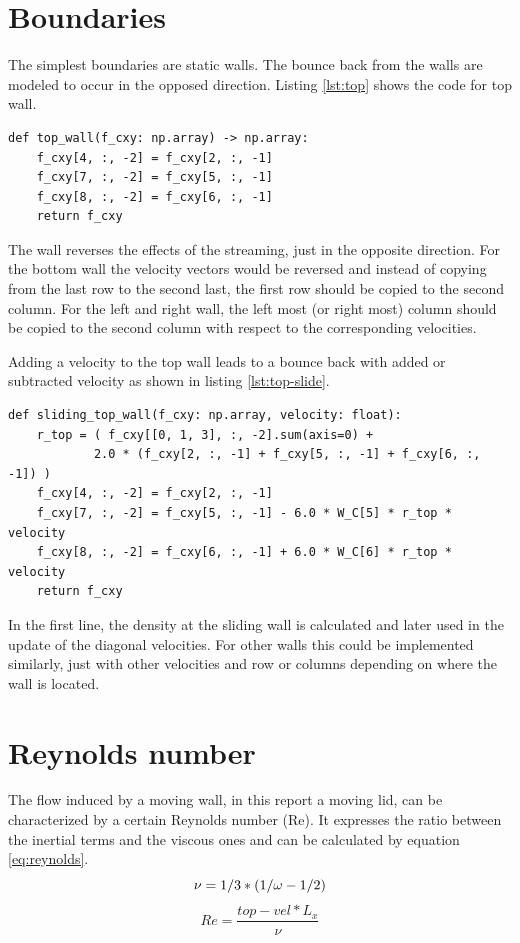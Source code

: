 \documentclass[a4paper,12pt, oneside]{book}
\begin{document}
\section{Boundaries}
The simplest boundaries are static walls. 
The bounce back from the walls are modeled to occur in the opposed direction. 
Listing \ref{lst:top} shows the code for top wall.
\begin{center}
  \begin{lstlisting}[caption=Bounce back at the top wall.,label=lst:top, basicstyle=\small]
def top_wall(f_cxy: np.array) -> np.array:
    f_cxy[4, :, -2] = f_cxy[2, :, -1]
    f_cxy[7, :, -2] = f_cxy[5, :, -1]
    f_cxy[8, :, -2] = f_cxy[6, :, -1]
    return f_cxy
  \end{lstlisting}
\end{center}
The wall reverses the effects of the streaming, just in the opposite direction.
For the bottom wall the velocity vectors would be reversed and instead of copying from the last row to the second last, the first row should be copied to the second column.
For the left and right wall, the left most (or right most) column should be copied to the second column with respect to the corresponding velocities.

Adding a velocity to the top wall leads to a bounce back with added or subtracted velocity as shown in listing \ref{lst:top-slide}. 
\begin{center}
  \begin{lstlisting}[caption=Bounce back at the top sliding wall.,label=lst:top-slide, basicstyle=\small]
def sliding_top_wall(f_cxy: np.array, velocity: float):
    r_top = ( f_cxy[[0, 1, 3], :, -2].sum(axis=0) + 
            2.0 * (f_cxy[2, :, -1] + f_cxy[5, :, -1] + f_cxy[6, :, -1]) )
    f_cxy[4, :, -2] = f_cxy[2, :, -1]
    f_cxy[7, :, -2] = f_cxy[5, :, -1] - 6.0 * W_C[5] * r_top * velocity
    f_cxy[8, :, -2] = f_cxy[6, :, -1] + 6.0 * W_C[6] * r_top * velocity
    return f_cxy
  \end{lstlisting}
\end{center}
In the first line, the density at the sliding wall is calculated and later used in the update of the diagonal velocities. For other walls this could be implemented similarly, just with other velocities and row or columns depending on where the wall is located.

\section{Reynolds number}
The flow induced by a moving wall, in this report a moving lid, can be characterized by a certain Reynolds number (Re).
It expresses the ratio between the inertial terms and the viscous ones and can be calculated by equation \ref{eq:reynolds}.
\begin{equation}
    \nu = 1 / 3 * (1 / \omega - 1 / 2) \\
\end{equation}
\begin{equation}\label{eq:reynolds}
     Re = \frac{top-vel * L_x}{\nu}
\end{equation}
\end{document}
